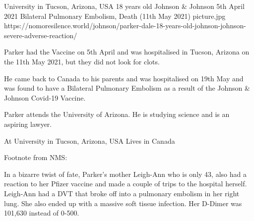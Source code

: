           {University in Tucson, Arizona, USA}
          {18 years old}
          {Johnson \& Johnson}
          {5th April 2021}
          {Bilateral Pulmonary Embolism, Death (11th May 2021)}
          {picture.jpg}
          {https://nomoresilence.world/johnson/parker-dale-18-years-old-johnson-johnson-severe-adverse-reaction/}
          {

Parker had the Vaccine on 5th April and was hospitalised in Tucson, Arizona on
the 11th May 2021, but they did not look for clots.

He came back to Canada to his parents and was hospitalised on 19th May and was
found to have a Bilateral Pulmonary Embolism as a result of the Johnson \&
Johnson Covid-19 Vaccine.

Parker attends the University of Arizona. He is studying science and is an
aspiring lawyer.

At University in Tucson, Arizona, USA Lives in Canada

Footnote from NMS:

In a bizarre twist of fate, Parker’s mother Leigh-Ann who is only 43, also had a
reaction to her Pfizer vaccine and made a couple of trips to the hospital
herself. Leigh-Ann had a DVT that broke off into a pulmonary embolism in her
right lung. She also ended up with a massive soft tissue infection. Her D-Dimer
was 101,630 instead of 0-500.

}
